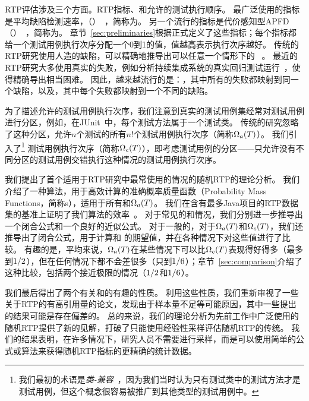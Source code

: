RTP评估涉及三个方面。RTP指标、\mappingMatrix{}和允许的测试执行顺序。
最广泛使用的指标是平均缺陷检测速率，（\APFDFull）~\cite{rothermel2001prioritizing}，简称为\APFD{}。
另一个流行的指标是代价感知型APFD（\APFDcFull）~\cite{elbaum2001incorporating}，简称为\APFDc{}。
章节~\ref{sec:preliminaries}根据\mappingMatrix{}正式定义了这些指标；每个指标都给一个测试用例执行次序分配一个0到1的值，值越高表示执行次序越好。
传统的RTP研究使用人造的缺陷，可以精确地推导出可以任意一个情形下的 \mappingMatrix{}~\cite{rothermel2002impact,elbaum2003understanding,kim2005empirical}。
最近的RTP研究大多使用真实的失败，例如分析持续集成系统的真实回归测试运行~\cite{Peng2020IRTCP,Elsner2021HPR,mattis2020RTPTorrent,lu2016does,Liang2018RedefTCP,elbaum2014techniques}，使得精确导出\mappingMatrix{}相当困难。
因此，越来越流行的\mappingMatrices{}是：\emph{\mappingAllToOne}，其中所有的失败都映射到同一个缺陷，以及\emph{\mappingOneToOne}，其中每个失败都映射到一个不同的缺陷。

为了描述允许的测试用例执行次序，我们注意到真实的测试用例集经常对测试用例进行分区，例如，在JUnit~\cite{2021JUnit}中，每个测试方法属于一个测试类。
传统的研究忽略了这种分区，允许$n$个测试的所有$n!$个测试用例执行次序（简称$\Omega_a(T)$）。
我们引入了\emph{\compatible{}}\footnote{我们最初的术语是\emph{类-兼容}~\cite{wei2021probabilistic}，因为我们当时认为只有测试类中的测试方法才是测试用例，但这个概念很容易被推广到其他类型的测试用例中。} 测试用例执行次序（简称$\Omega_c(T)$），即考虑测试用例的分区——只允许没有不同分区的测试用例交错执行这种情况的测试用例执行次序。

我们提出了首个适用于RTP研究中最常使用的情况的随机RTP的理论分析。
我们介绍了一种算法，用于高效计算\APFD{}的准确概率质量函数（Probability Mass Functions，简称\distribution{}s），适用于所有\mappingMatrices{}和$\Omega_a(T)$。
我们在含有最多Java项目的RTP数据集的基准上证明了我们算法的效率~\cite{Peng2020IRTCP}。
对于常见的\mappingAllToOne{}和\mappingOneToOne{}情况，我们分别进一步推导出一个闭合公式和一个良好的近似公式。
对于一般的\mappingMatrix{}，对于$\Omega_a(T)$和$\Omega_c(T)$，我们还推导出了闭合公式，用于计算\APFD{}和 \APFDc{}的期望值，并在各种情况下对这些值进行了比较。
有趣的是，平均来说，$\Omega_a(T)$在某些情况下可以比$\Omega_c(T)$表现得好得多（最多到$1/2$），但在任何情况下都不会差很多（只到$1/6$）；章节~\ref{sec:comparison}介绍了这种比较，包括两个接近极限的情况（$1/2$和$1/6$）。

我们最后得出了两个有关\APFD{}和\APFDc{}的有趣的性质。
利用这些性质，我们重新审视了一些关于RTP的有高引用量的论文，发现由于样本量不足等可能原因，其中一些提出的结果可能是存在偏差的。
总的来说，我们的理论分析为先前工作中广泛使用的随机RTP提供了新的见解，打破了只能使用经验性采样评估随机RTP的传统。
我们的结果表明，在许多情况下，研究人员不需要进行采样，而是可以使用简单的公式或算法来获得随机RTP指标的更精确的统计数据。

